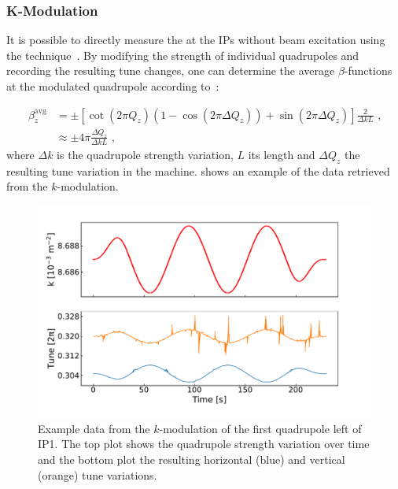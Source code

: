 \subsubsection*{K-Modulation}

It is possible to directly measure the  at the \glspl{IP} without beam excitation using the  technique~\cite{IPAC:Calaga:LHC_K_Modulation}.
By modifying the strength of individual quadrupoles and recording the resulting tune changes, one can determine the average \(\beta\)-functions at the modulated quadrupole according to~\cite{BOOK:Minty:Measurements_Control_Charged_Particle_Beams}:

\begin{equation}
  \begin{aligned}
    \beta^{\mathrm{avg}}_{z} & = \pm \left[ \cot \left(2 \pi Q_z \right) \left( 1 - \cos \left(2 \pi \Delta Q_z \right) \right) + \sin \left( 2 \pi \Delta Q_z \right) \right] \frac{2}{\Delta k L} \text{ ,}  \\
                               & \approx \pm 4 \pi \frac{\Delta Q_z}{\Delta k L} \text{ ,}
  \end{aligned}
  \label{equation:k_modulation_average_beta}
\end{equation}
where \(\Delta k\) is the quadrupole strength variation, \(L\) its length and \(\Delta Q_z\) the resulting tune variation in the machine.
 shows an example of the data retrieved from the \(k\)-modulation.

\begin{figure}[!htb]
  \centering
  \includegraphics*[width=\linewidth]{Figures/Optics_Measurements_Corrections_at_LHC/k_modulation.pdf}
  \caption{Example data from the \(k\)-modulation of the first quadrupole left of IP\num{1}. The top plot shows the quadrupole strength variation over time and the bottom plot the resulting horizontal (\textcolor{mplblue}{blue}) and vertical (\textcolor{mplorange}{orange}) tune variations.}
  \label{figure:kmod_mqxa1l1}
\end{figure}

